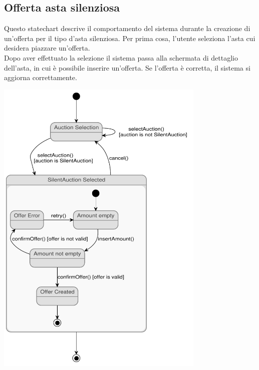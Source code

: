 \subsection{Offerta asta silenziosa}
Questo statechart descrive il comportamento del sistema durante la creazione di un'offerta per il tipo d'asta silenziosa.
Per prima cosa, l'utente seleziona l'asta cui desidera piazzare un'offerta.\\
Dopo aver effettuato la selezione il sistema passa alla schermata di dettaglio dell'asta, in cui è possibile inserire un'offerta.
Se l'offerta è corretta, il sistema si aggiorna correttamente.
\begin{center}
	\includegraphics[width=0.75\textwidth]{assets/state_charts/offerta_asta_silenziosa.pdf}
\end{center}
\newpage

